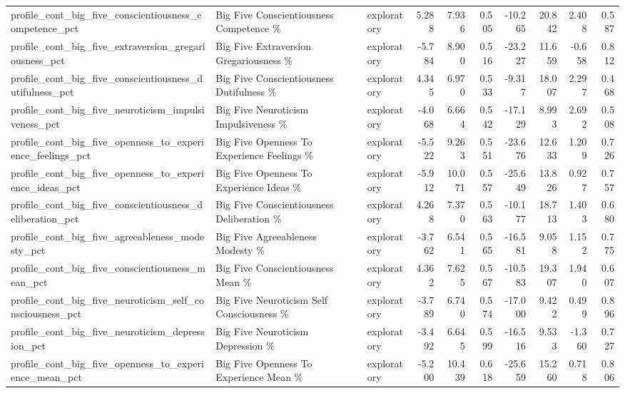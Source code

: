 \begin{table}[htbp]
{\begin{tabular}{lllrrrrrrr}
profile\_cont\_big\_five\_conscientiousness\_competence\_pct & Big Five Conscientiousness Competence \% & exploratory & 5.288 & 7.936 & 0.505 & -10.265 & 20.842 & 2.408 & 0.587 \\
profile\_cont\_big\_five\_extraversion\_gregariousness\_pct & Big Five Extraversion Gregariousness \% & exploratory & -5.784 & 8.900 & 0.516 & -23.227 & 11.659 & -0.658 & 0.812 \\
profile\_cont\_big\_five\_conscientiousness\_dutifulness\_pct & Big Five Conscientiousness Dutifulness \% & exploratory & 4.345 & 6.970 & 0.533 & -9.317 & 18.007 & 2.297 & 0.468 \\
profile\_cont\_big\_five\_neuroticism\_impulsiveness\_pct & Big Five Neuroticism Impulsiveness \% & exploratory & -4.068 & 6.664 & 0.542 & -17.129 & 8.993 & 2.692 & 0.508 \\
profile\_cont\_big\_five\_openness\_to\_experience\_feelings\_pct & Big Five Openness To Experience Feelings \% & exploratory & -5.522 & 9.263 & 0.551 & -23.676 & 12.633 & 1.209 & 0.726 \\
profile\_cont\_big\_five\_openness\_to\_experience\_ideas\_pct & Big Five Openness To Experience Ideas \% & exploratory & -5.912 & 10.071 & 0.557 & -25.649 & 13.826 & 0.927 & 0.757 \\
profile\_cont\_big\_five\_conscientiousness\_deliberation\_pct & Big Five Conscientiousness Deliberation \% & exploratory & 4.268 & 7.370 & 0.563 & -10.177 & 18.713 & 1.403 & 0.680 \\
profile\_cont\_big\_five\_agreeableness\_modesty\_pct & Big Five Agreeableness Modesty \% & exploratory & -3.762 & 6.541 & 0.565 & -16.581 & 9.058 & 1.152 & 0.775 \\
profile\_cont\_big\_five\_conscientiousness\_mean\_pct & Big Five Conscientiousness Mean \% & exploratory & 4.362 & 7.625 & 0.567 & -10.583 & 19.307 & 1.940 & 0.607 \\
profile\_cont\_big\_five\_neuroticism\_self\_consciousness\_pct & Big Five Neuroticism Self Consciousness \% & exploratory & -3.789 & 6.740 & 0.574 & -17.000 & 9.422 & 0.499 & 0.896 \\
profile\_cont\_big\_five\_neuroticism\_depression\_pct & Big Five Neuroticism Depression \% & exploratory & -3.492 & 6.645 & 0.599 & -16.516 & 9.533 & -1.360 & 0.727 \\
profile\_cont\_big\_five\_openness\_to\_experience\_mean\_pct & Big Five Openness To Experience Mean \% & exploratory & -5.200 & 10.439 & 0.618 & -25.659 & 15.260 & 0.718 & 0.806 \\

\end{tabular}}
\end{table}
